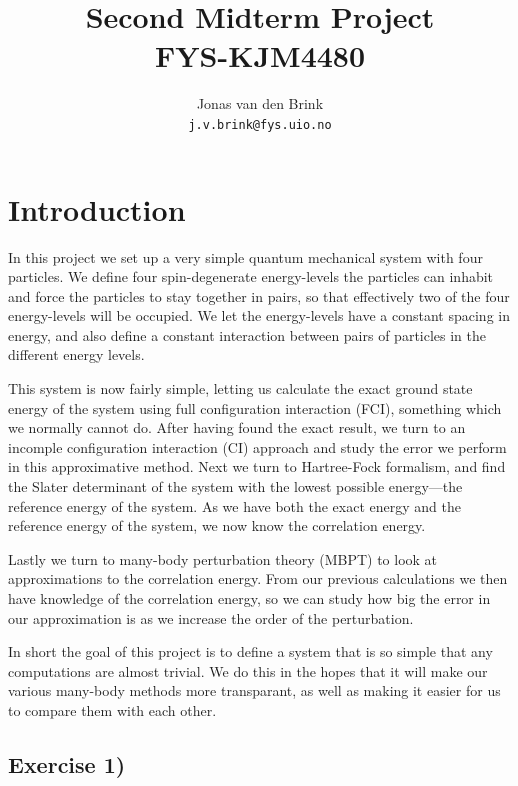 \documentclass[a4paper, 11pt, notitlepage, english]{article}
\author{Jonas van den Brink \\ \texttt{j.v.brink@fys.uio.no}}
\title{Second Midterm Project \\ FYS-KJM4480}
\begin{document}
\maketitle

\vspace{4cm}

\section*{Introduction}

In this project we set up a very simple quantum mechanical system with four particles. We define four spin-degenerate energy-levels the particles can inhabit and force the particles to stay together in pairs, so that effectively two of the four energy-levels will be occupied. We let the energy-levels have a constant spacing in energy, and also define a constant interaction between pairs of particles in the different energy levels.

This system is now fairly simple, letting us calculate the exact ground state energy of the system using full configuration interaction (FCI), something which we normally cannot do. After having found the exact result, we turn to an incomple configuration interaction (CI) approach and study the error we perform in this approximative method. Next we turn to Hartree-Fock formalism, and find the Slater determinant of the system with the lowest possible energy---the reference energy of the system. As we have both the exact energy and the reference energy of the system, we now know the correlation energy. 

Lastly we turn to many-body perturbation theory (MBPT) to look at approximations to the correlation energy. From our previous calculations we then have knowledge of the correlation energy, so we can study how big the error in our approximation is as we increase the order of the perturbation.

In short the goal of this project is to define a system that is so simple that any computations are almost trivial. We do this in the hopes that it will make our various many-body methods more transparant, as well as making it easier for us to compare them with each other.

\clearpage

\subsection*{Exercise 1)}
\end{document}
